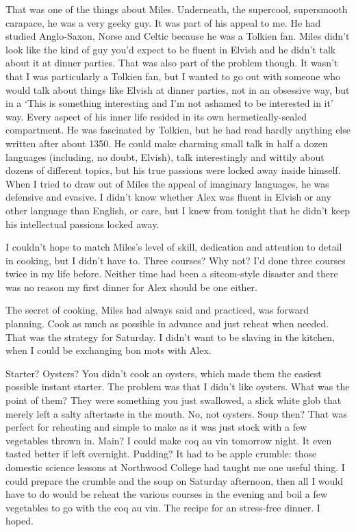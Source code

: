 That was one of the things about Miles. Underneath, the supercool,
supersmooth carapace, he was a very geeky guy. It was part of his
appeal to me. He had studied Anglo-Saxon, Norse and Celtic because
he was a {\twelveit Tolkien\/} fan. Miles didn't look like the kind
of guy you'd expect to be fluent in Elvish and he didn't talk about
it at dinner parties. That was also part of the problem though. It
wasn't that I was particularly a Tolkien fan, but I wanted to go out
with someone who would talk about things like Elvish at dinner
parties, not in an obsessive way, but in a `This is something
interesting and I'm not ashamed to be interested in it' way. Every
aspect of his inner life resided in its own hermetically-sealed
compartment. He was fascinated by Tolkien, but he had read hardly
anything else written after about 1350. He could make charming small
talk in half a dozen languages (including, no doubt, Elvish), talk
interestingly and wittily about dozens of different topics, but his
true passions were locked away inside himself. When I tried to draw out of
Miles the appeal of imaginary languages, he was defensive and
evasive. I didn't know whether Alex was fluent in Elvish or any
other language than English, or care, but I knew from tonight that
he didn't keep his intellectual passions locked away.

I couldn't hope to match Miles's level of skill, dedication and
attention to detail in cooking, but I didn't have to. Three courses?
Why not? I'd done three courses twice in my life before. Neither
time had been a sitcom-style disaster and there was no reason my
first dinner for Alex should be one either.

The secret of cooking, Miles had always said and practiced, was
forward planning. Cook as much as possible in advance and just
reheat when needed. That was the strategy for Saturday. I didn't
want to be slaving in the kitchen, when I could be exchanging
{\twelveit bon mots\/} with Alex.

Starter? Oysters? You didn't cook an oysters, which made them the
easiest possible instant starter. The problem was that I didn't like
oysters. What was the point of them? They were something you just
swallowed, a slick white glob that merely left a salty aftertaste in
the mouth. No, not oysters. Soup then? That was perfect for
reheating and simple to make as it was just stock with a few
vegetables thrown in. Main? I could make coq au vin tomorrow night.
It even tasted better if left overnight. Pudding? It had to be apple
crumble: those domestic science lessons at Northwood College had
taught me one useful thing. I could prepare the crumble and the soup
on Saturday afternoon, then all I would have to do would be reheat
the various courses in the evening and boil a few vegetables to go
with the coq au vin. The recipe for an stress-free dinner. I hoped.

